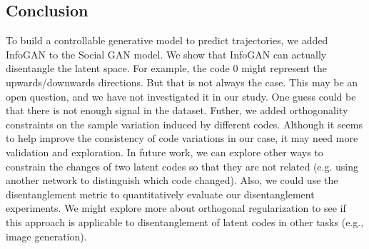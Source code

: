 \subsection{Conclusion}
To build a controllable generative model to predict trajectories, we added InfoGAN to the Social GAN model. We show that InfoGAN can actually disentangle the latent space. For example, the code 0 might represent the upwards/downwards directions. But that is not always the case. This may be an open question, and we have not investigated it in our study. One guess could be that there is not enough signal in the dataset. Futher, we added orthogonality constraints on the sample variation induced by different codes. Although it seems to help improve the consistency of code variations in our case, it may need more validation and exploration. In future work, we can explore other ways to constrain the changes of two latent codes so that they are not related (e.g. using another network to distinguish which code changed). Also, we could use the disentanglement metric to quantitatively evaluate our disentanglement experiments. We might explore more about orthogonal regularization to see if this approach is applicable to disentanglement of latent codes in other tasks (e.g., image generation).